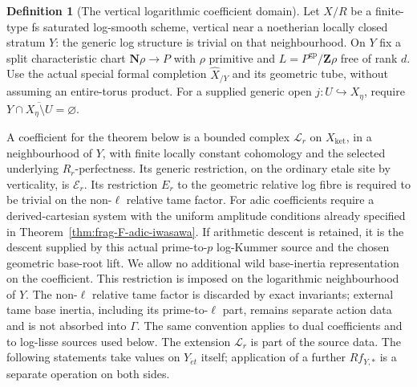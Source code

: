 \documentclass[11pt]{article}
\theoremstyle{definition}
\newtheorem{definition}[theorem]{Definition}
\theoremstyle{remark}
\begin{document}
\begin{definition}[The vertical logarithmic coefficient domain]
\label{def:frag-vertical-log-B-domain}
Let $X/R$ be a finite-type fs saturated log-smooth scheme, vertical near
a noetherian locally closed stratum $Y$: the generic log structure is
trivial on that neighbourhood.  On $Y$ fix a split characteristic chart
$\mathbf N\rho\to P$ with $\rho$ primitive and
$L=P^{\mathrm{gp}}/\mathbf Z\rho$ free of rank $d$.  Use the actual
special formal completion $\widehat X_{/Y}$ and its geometric tube,
without assuming an entire-torus product.  For a supplied generic open
$j:U\hookrightarrow X_\eta$, require
$Y\cap\overline{X_\eta\setminus U}=\varnothing$.

A coefficient for the theorem below is a bounded complex $\mathcal L_r$
on $X_{\mathrm{ket}}$, in a neighbourhood of $Y$, with finite locally
constant cohomology and the selected underlying $R_r$-perfectness.  Its
generic restriction, on the ordinary etale site by verticality, is
$\mathcal E_r$.  Its restriction $E_r$ to the geometric relative log
fibre is required to be trivial on the non-$\ell$ relative tame factor.
For adic coefficients require a derived-cartesian system with the
uniform amplitude conditions already specified in Theorem~\ref{thm:frag-F-adic-iwasawa}.
If arithmetic descent is retained, it is the descent supplied by this
actual prime-to-$p$ log-Kummer source and the chosen geometric base-root
lift.  We allow no additional wild base-inertia representation on the
coefficient.  This restriction is imposed on the logarithmic
neighbourhood of $Y$.  The non-$\ell$
relative tame factor is discarded by exact invariants; external tame
base inertia, including its prime-to-$\ell$ part, remains separate
action data and is not absorbed into $\Gamma$.  The same convention
applies to dual coefficients and to log-lisse sources used below.
The extension $\mathcal L_r$ is part of the source data.
The following statements take values on $Y_{\acute et}$ itself;
application of a further $Rf_{Y,*}$ is a separate operation on both sides.
\end{definition}
\end{document}

